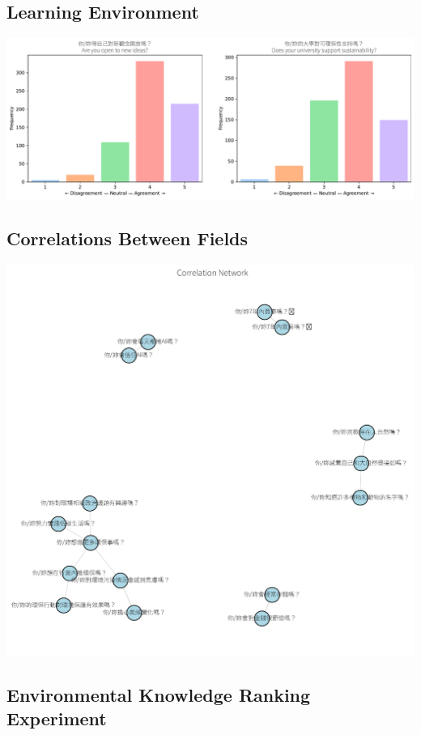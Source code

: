 \documentclass[
  letterpaper,
  DIV=11,
  numbers=noendperiod]{scrartcl}
\begin{document}
\subsection{Learning Environment}\label{learning-environment}

\includegraphics{_thesis_files/figure-pdf/cell-75-output-1.pdf}

\subsection{Correlations Between
Fields}\label{correlations-between-fields}

\includegraphics{_thesis_files/figure-pdf/cell-76-output-1.pdf}

\subsection{Environmental Knowledge Ranking
Experiment}\label{environmental-knowledge-ranking-experiment}
\end{document}
